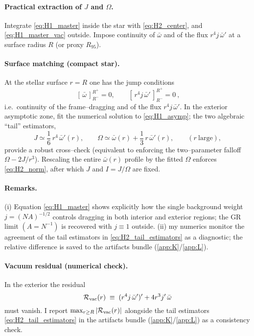 \documentclass{iopjournal}
\begin{document}
\paragraph{Practical extraction of $J$ and $\Omega$.}
Integrate \eqref{eq:H1_master} inside the star with \eqref{eq:H2_center}, and \eqref{eq:H1_master_vac} outside. Impose continuity of $\bar\omega$ and of the flux $r^{4}j\,\bar\omega'$ at a surface radius $R$ (or proxy $R_{95}$). \paragraph{Surface matching (compact star).}
At the stellar surface $r=R$ one has the jump conditions
\begin{equation}
\boxed{\ [\,\bar\omega\,]_{R^-}^{R^+}=0,\qquad
[\,r^{4}j\,\bar\omega'\,]_{R^-}^{R^+}=0\ },
\label{eq:H2_matching}
\end{equation}
i.e.\ continuity of the frame–dragging and of the flux $r^{4}j\,\bar\omega'$.
In the exterior asymptotic zone, fit the numerical solution to \eqref{eq:H1_asymp}; the two algebraic ``tail'' estimators,
\begin{equation}
J\simeq \frac{1}{6}\,r^{4}\,\bar\omega'(r),\qquad
\Omega\simeq \bar\omega(r)+\frac{1}{3}\,r\,\bar\omega'(r),
\qquad (r\ \text{large}),
\label{eq:H2_tail_estimators}
\end{equation}
provide a robust cross–check (equivalent to enforcing the two–parameter falloff $\Omega-2J/r^{3}$). Rescaling the entire $\bar\omega(r)$ profile by the fitted $\Omega$ enforces \eqref{eq:H2_norm}, after which $J$ and $I=J/\Omega$ are fixed.

\paragraph{Remarks.}
(i) Equation \eqref{eq:H1_master} shows explicitly how the single background weight $j=(NA)^{-1/2}$ controls dragging in both interior and exterior regions; the GR limit $(A=N^{-1})$ is recovered with $j\equiv1$ outside. (ii) my numerics monitor the agreement of the tail estimators in \eqref{eq:H2_tail_estimators} as a diagnostic; the relative difference is saved to the artifacts bundle (\cref{app:K}/\cref{app:L}).
\paragraph{Vacuum residual (numerical check).}
In the exterior the residual
\begin{equation}
\mathcal{R}_{\rm vac}(r)\;\equiv\;(r^{4}j\,\bar\omega')'+4r^{3}j'\,\bar\omega
\label{eq:H2_residual}
\end{equation}
must vanish. I report $\max_{r\ge R}|\mathcal{R}_{\rm vac}(r)|$ alongside the tail estimators \eqref{eq:H2_tail_estimators} in the artifacts bundle (\cref{app:K}/\cref{app:L}) as a consistency check.
\end{document}
